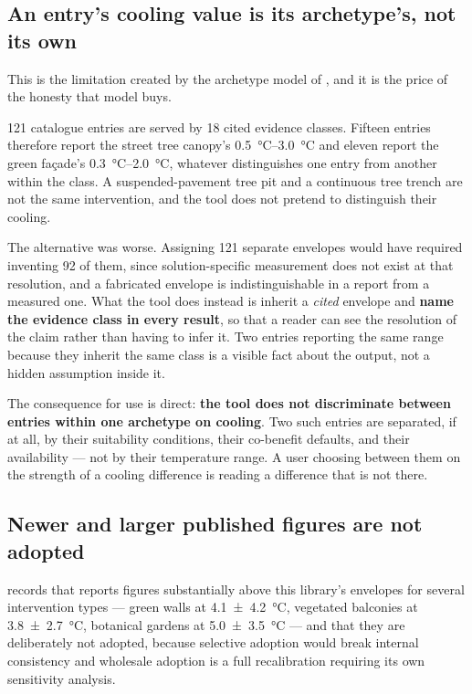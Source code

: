 \subsection{An entry's cooling value is its archetype's, not its own}
\label{sec:limit-inheritance}

This is the limitation created by the archetype model of
, and it is the price of the honesty that model buys.

\num{121} catalogue entries are served by \num{18} cited evidence classes.
Fifteen entries therefore report the street tree canopy's
\SIrange{0.5}{3.0}{\degreeCelsius} and eleven report the green fa\c{c}ade's
\SIrange{0.3}{2.0}{\degreeCelsius}, whatever distinguishes one entry from
another within the class. A suspended-pavement tree pit and a continuous tree
trench are not the same intervention, and the tool does not pretend to
distinguish their cooling.

The alternative was worse. Assigning \num{121} separate envelopes would have
required inventing \num{92} of them, since solution-specific measurement does
not exist at that resolution, and a fabricated envelope is indistinguishable in
a report from a measured one. What the tool does instead is inherit a
\emph{cited} envelope and \textbf{name the evidence class in every result}, so
that a reader can see the resolution of the claim rather than having to infer
it. Two entries reporting the same range because they inherit the same class is
a visible fact about the output, not a hidden assumption inside it.

The consequence for use is direct: \textbf{the tool does not discriminate
between entries within one archetype on cooling}. Two such entries are
separated, if at all, by their suitability conditions, their co-benefit
defaults, and their availability --- not by their temperature range. A user
choosing between them on the strength of a cooling difference is reading a
difference that is not there.

\subsection{Newer and larger published figures are not adopted}
\label{sec:limit-non-adoption}

 records that \textcite{kumar2024} reports figures
substantially above this library's envelopes for several intervention types ---
green walls at \qty{4.1(42)}{\degreeCelsius}, vegetated balconies at
\qty{3.8(27)}{\degreeCelsius}, botanical gardens at
\qty{5.0(35)}{\degreeCelsius} --- and that they are deliberately not adopted,
because selective adoption would break internal consistency and wholesale
adoption is a full recalibration requiring its own sensitivity analysis.

